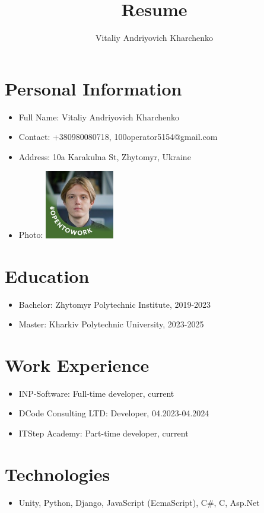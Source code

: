 \documentclass{article}
\begin{document}
\title{Resume}
\author{Vitaliy Andriyovich Kharchenko}
\date{}

\maketitle

\section*{Personal Information}
\begin{itemize}
    \item Full Name: Vitaliy Andriyovich Kharchenko
    \item Contact: +380980080718, 100operator5154@gmail.com
    \item Address: 10a Karakulna St, Zhytomyr, Ukraine
    \item Photo: \includegraphics[width=3cm]{1710884794904}
\end{itemize}

\section*{Education}
\begin{itemize}
    \item Bachelor: Zhytomyr Polytechnic Institute, 2019-2023
    \item Master: Kharkiv Polytechnic University, 2023-2025
\end{itemize}

\section*{Work Experience}
\begin{itemize}
    \item INP-Software: Full-time developer, current
    \item DCode Consulting LTD: Developer, 04.2023-04.2024
    \item ITStep Academy: Part-time developer, current
\end{itemize}

\section*{Technologies}
\begin{itemize}
    \item Unity, Python, Django, JavaScript (EcmaScript), C\#, C, Asp.Net
\end{itemize}
\end{document}

